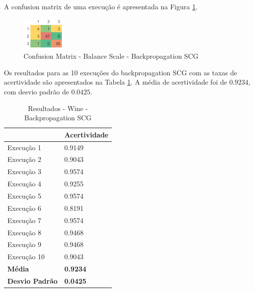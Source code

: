 A confusion matrix de uma execução é apresentada na Figura \ref{figura-confusion-matrix-balance-scale-backpropagation-scg}.

\begin{figure}[h!]
  \centering
  \includegraphics[width=0.3\linewidth]{figs/confusion-matrix-balance-scale-backpropagation-scg.png}
  \caption{Confusion Matrix - Balance Scale - Backpropagation SCG}
  \label{figura-confusion-matrix-balance-scale-backpropagation-scg}
\end{figure}

Os resultados para as 10 execuções do backpropagation SCG com as taxas de acertividade são apresentados na Tabela \ref{tabela-resultado-balance-scale-scg}. A média de acertividade foi de $0.9234$, com desvio padrão de $0.0425$.

\begin{table}[h!]
\centering
\caption{Resultados - Wine - Backpropagation SCG}
\label{tabela-resultado-balance-scale-scg}
\begin{tabular}{ll}
\toprule
                       & \textbf{Acertividade}       \\ \midrule
Execução 1             & 0.9149          \\
Execução 2             & 0.9043          \\
Execução 3             & 0.9574           \\
Execução 4             & 0.9255          \\
Execução 5             & 0.9574           \\
Execução 6             & 0.8191          \\
Execução 7             & 0.9574           \\
Execução 8             & 0.9468           \\
Execução 9             & 0.9468          \\
Execução 10            & 0.9043          \\ \bottomrule
\textbf{Média}         & \textbf{0.9234} \\
\textbf{Desvio Padrão} & \textbf{0.0425}
\end{tabular}
\end{table}

%
